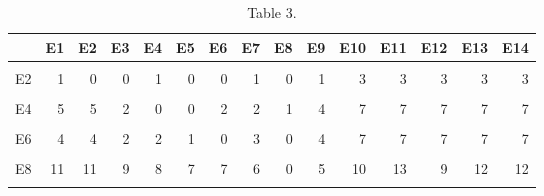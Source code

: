 \begin{table}[H]

\caption{Table 3.}
\centering
\fontsize{8}{10}\selectfont
\begin{tabular}[t]{lrrrrrrrrrrrrrr}
\toprule
  & E1 & E2 & E3 & E4 & E5 & E6 & E7 & E8 & E9 & E10 & E11 & E12 & E13 & E14\\
\midrule
\cellcolor{gray!6}{E1} & \cellcolor{gray!6}{0} & \cellcolor{gray!6}{1} & \cellcolor{gray!6}{0} & \cellcolor{gray!6}{1} & \cellcolor{gray!6}{0} & \cellcolor{gray!6}{0} & \cellcolor{gray!6}{1} & \cellcolor{gray!6}{0} & \cellcolor{gray!6}{2} & \cellcolor{gray!6}{3} & \cellcolor{gray!6}{3} & \cellcolor{gray!6}{3} & \cellcolor{gray!6}{3} & \cellcolor{gray!6}{3}\\
E2 & 1 & 0 & 0 & 1 & 0 & 0 & 1 & 0 & 1 & 3 & 3 & 3 & 3 & 3\\
\cellcolor{gray!6}{E3} & \cellcolor{gray!6}{3} & \cellcolor{gray!6}{3} & \cellcolor{gray!6}{0} & \cellcolor{gray!6}{1} & \cellcolor{gray!6}{0} & \cellcolor{gray!6}{1} & \cellcolor{gray!6}{2} & \cellcolor{gray!6}{1} & \cellcolor{gray!6}{4} & \cellcolor{gray!6}{6} & \cellcolor{gray!6}{6} & \cellcolor{gray!6}{6} & \cellcolor{gray!6}{6} & \cellcolor{gray!6}{6}\\
E4 & 5 & 5 & 2 & 0 & 0 & 2 & 2 & 1 & 4 & 7 & 7 & 7 & 7 & 7\\
\cellcolor{gray!6}{E5} & \cellcolor{gray!6}{5} & \cellcolor{gray!6}{5} & \cellcolor{gray!6}{2} & \cellcolor{gray!6}{1} & \cellcolor{gray!6}{0} & \cellcolor{gray!6}{2} & \cellcolor{gray!6}{2} & \cellcolor{gray!6}{1} & \cellcolor{gray!6}{5} & \cellcolor{gray!6}{8} & \cellcolor{gray!6}{8} & \cellcolor{gray!6}{8} & \cellcolor{gray!6}{8} & \cellcolor{gray!6}{8}\\
\addlinespace
E6 & 4 & 4 & 2 & 2 & 1 & 0 & 3 & 0 & 4 & 7 & 7 & 7 & 7 & 7\\
\cellcolor{gray!6}{E7} & \cellcolor{gray!6}{8} & \cellcolor{gray!6}{8} & \cellcolor{gray!6}{6} & \cellcolor{gray!6}{5} & \cellcolor{gray!6}{4} & \cellcolor{gray!6}{6} & \cellcolor{gray!6}{0} & \cellcolor{gray!6}{2} & \cellcolor{gray!6}{5} & \cellcolor{gray!6}{7} & \cellcolor{gray!6}{8} & \cellcolor{gray!6}{6} & \cellcolor{gray!6}{8} & \cellcolor{gray!6}{8}\\
E8 & 11 & 11 & 9 & 8 & 7 & 7 & 6 & 0 & 5 & 10 & 13 & 9 & 12 & 12\\
\cellcolor{gray!6}{E9} & \cellcolor{gray!6}{11} & \cellcolor{gray!6}{10} & \cellcolor{gray!6}{10} & \cellcolor{gray!6}{9} & \cellcolor{gray!6}{9} & \cellcolor{gray!6}{9} & \cellcolor{gray!6}{7} & \cellcolor{gray!6}{3} & \cellcolor{gray!6}{0} & \cellcolor{gray!6}{8} & \cellcolor{gray!6}{9} & \cellcolor{gray!6}{7} & \cellcolor{gray!6}{9} & \cellcolor{gray!6}{9}\\

\end{tabular}
\end{table}
